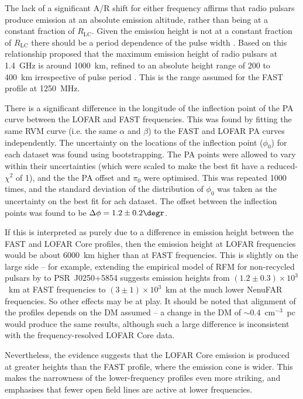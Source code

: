 The lack of a significant A/R shift for either frequency affirms that radio pulsars produce emission at an absolute emission altitude, rather than being at a constant fraction of $R_\mathrm{LC}$. Given the emission height is not at a constant fraction of $R_\mathrm{LC}$ there should be a period dependence of the pulse width \citep[e.g.][]{Rxxx1993}. Based on this relationship \citet{KJxx2007} proposed that the maximum emission height of radio pulsars at 1.4~GHz is around 1000~km, refined to an absolute height range of 200 to 400~km irrespective of pulse period \citep{JKxx2019, JSKx2020}. This is the range assumed for the FAST profile at 1250~MHz.

There is a significant difference in the longitude of the inflection point of the PA curve between the LOFAR and FAST frequencies. This was found by fitting the same RVM curve (i.e. the same $\alpha$ and $\beta$) to the FAST and LOFAR PA curves independently. The uncertainty on the locations of the inflection point ($\phi_0$) for each dataset was found using bootstrapping. The PA points were allowed to vary within their uncertainties (which were scaled to make the best fit have a reduced-$\chi^2$ of 1), and the the PA offset and $\pi_0$ were optimised. This was repeated 1000 times, and the standard deviation of the distribution of $\phi_0$ was taken as the uncertainty on the best fit for ach dataset. The offset between the inflection points was found to be $\Delta \phi = 1.2\pm 0.2\degr$.

If this is interpreted as purely due to a difference in emission height between the FAST and LOFAR Core profiles, then the emission height at LOFAR frequencies would be about 6000~km higher than at FAST frequencies. This is slightly on the large side -- for example, extending the empirical model of RFM for non-recycled pulsars by \citet{KGxx2003} to PSR~J0250+5854 suggests emission heights from $(1.2\pm0.3)\times 10^3$~km at FAST frequencies to $(3\pm1)\times10^3$~km at the much lower NenuFAR frequencies. So other effects may be at play. It should be noted that alignment of the profiles depends on the DM assumed -- a change in the DM of $\sim$0.4~cm$^{-3}$~pc would produce the same results, although such a large difference is inconsistent with the frequency-resolved LOFAR Core data. 

Nevertheless, the evidence suggests that the LOFAR Core emission is produced at greater heights than the FAST profile, where the emission cone is wider. This makes the narrowness of the lower-frequency profiles even more striking, and emphasises that fewer open field lines are active at lower frequencies.















